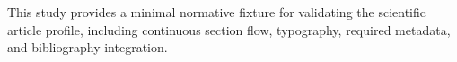This study provides a minimal normative fixture for validating the scientific article profile, including continuous section flow, typography, required metadata, and bibliography integration.

